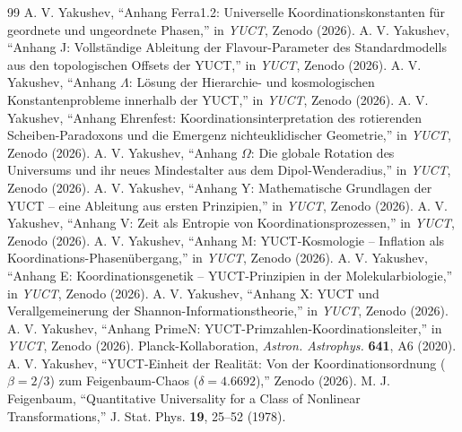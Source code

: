 \documentclass[12pt,a4paper]{article}
\begin{document}
	\begin{thebibliography}{99}
		 A. V. Yakushev, ``Anhang Ferra1.2: Universelle Koordinationskonstanten für geordnete und ungeordnete Phasen,'' in \emph{YUCT}, Zenodo (2026).
		 A. V. Yakushev, ``Anhang J: Vollständige Ableitung der Flavour-Parameter des Standardmodells aus den topologischen Offsets der YUCT,'' in \emph{YUCT}, Zenodo (2026).
		 A. V. Yakushev, ``Anhang \(\Lambda\): Lösung der Hierarchie- und kosmologischen Konstantenprobleme innerhalb der YUCT,'' in \emph{YUCT}, Zenodo (2026).
		 A. V. Yakushev, ``Anhang Ehrenfest: Koordinationsinterpretation des rotierenden Scheiben-Paradoxons und die Emergenz nichteuklidischer Geometrie,'' in \emph{YUCT}, Zenodo (2026).
		 A. V. Yakushev, ``Anhang \(\Omega\): Die globale Rotation des Universums und ihr neues Mindestalter aus dem Dipol-Wenderadius,'' in \emph{YUCT}, Zenodo (2026).
		 A. V. Yakushev, ``Anhang Y: Mathematische Grundlagen der YUCT – eine Ableitung aus ersten Prinzipien,'' in \emph{YUCT}, Zenodo (2026).
		 A. V. Yakushev, ``Anhang V: Zeit als Entropie von Koordinationsprozessen,'' in \emph{YUCT}, Zenodo (2026).
		 A. V. Yakushev, ``Anhang M: YUCT-Kosmologie – Inflation als Koordinations-Phasenübergang,'' in \emph{YUCT}, Zenodo (2026).
		 A. V. Yakushev, ``Anhang E: Koordinationsgenetik – YUCT-Prinzipien in der Molekularbiologie,'' in \emph{YUCT}, Zenodo (2026).
		 A. V. Yakushev, ``Anhang X: YUCT und Verallgemeinerung der Shannon-Informationstheorie,'' in \emph{YUCT}, Zenodo (2026).
		 A. V. Yakushev, ``Anhang PrimeN: YUCT-Primzahlen-Koordinationsleiter,'' in \emph{YUCT}, Zenodo (2026).
		 Planck-Kollaboration, \emph{Astron. Astrophys.} \textbf{641}, A6 (2020).
		 A. V. Yakushev, ``YUCT-Einheit der Realität: Von der Koordinationsordnung (\(\beta = 2/3\)) zum Feigenbaum-Chaos (\(\delta = 4.6692\)),'' Zenodo (2026).
		 M. J. Feigenbaum, ``Quantitative Universality for a Class of Nonlinear Transformations,'' J. Stat. Phys. \textbf{19}, 25–52 (1978).
	\end{thebibliography}
	
\end{document}
